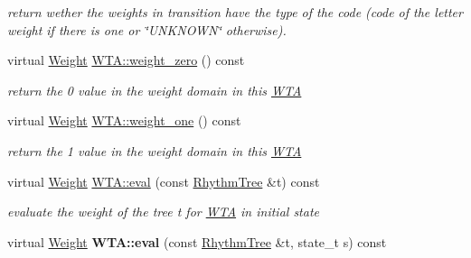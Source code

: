 \begin{DoxyCompactItemize}
\begin{DoxyCompactList}\small\item\em return wether the weights in transition have the type of the code (code of the letter weight if there is one or \char`\"{}\+U\+N\+K\+N\+O\+W\+N\char`\"{} otherwise). \end{DoxyCompactList}\item 
\mbox{\label{group__schemata_ga762b5bbee46468815993417ca9b3d9c6}} 
virtual \mbox{\hyperlink{classWeight}{Weight}} \mbox{\hyperlink{group__schemata_ga762b5bbee46468815993417ca9b3d9c6}{W\+T\+A\+::weight\+\_\+zero}} () const
\begin{DoxyCompactList}\small\item\em return the 0 value in the weight domain in this \mbox{\hyperlink{classWTA}{W\+TA}} \end{DoxyCompactList}\item 
\mbox{\label{group__schemata_gabfe48e6398d83c03161b664dadcf8fcd}} 
virtual \mbox{\hyperlink{classWeight}{Weight}} \mbox{\hyperlink{group__schemata_gabfe48e6398d83c03161b664dadcf8fcd}{W\+T\+A\+::weight\+\_\+one}} () const
\begin{DoxyCompactList}\small\item\em return the 1 value in the weight domain in this \mbox{\hyperlink{classWTA}{W\+TA}} \end{DoxyCompactList}\item 
\mbox{\label{group__schemata_gaa6598176fb91c70988bea7cf824ec157}} 
virtual \mbox{\hyperlink{classWeight}{Weight}} \mbox{\hyperlink{group__schemata_gaa6598176fb91c70988bea7cf824ec157}{W\+T\+A\+::eval}} (const \mbox{\hyperlink{classRhythmTree}{Rhythm\+Tree}} \&t) const
\begin{DoxyCompactList}\small\item\em evaluate the weight of the tree t for \mbox{\hyperlink{classWTA}{W\+TA}} in initial state \end{DoxyCompactList}\item 
\mbox{\label{group__schemata_gac842f196f85e3c3b079c7c0992173e46}} 
virtual \mbox{\hyperlink{classWeight}{Weight}} {\bfseries W\+T\+A\+::eval} (const \mbox{\hyperlink{classRhythmTree}{Rhythm\+Tree}} \&t, state\+\_\+t s) const
\item 
\mbox{\label{group__schemata_gaeb713b8807bc81c6c6519ced5d531e06}} 

\end{DoxyCompactItemize}
